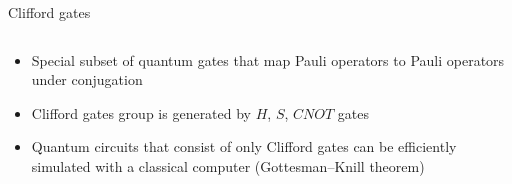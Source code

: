 \documentclass[aspectratio=169,10pt]{beamer}
\begin{document}
\begin{frame}{Clifford gates}
  \begin{columns}
    \begin{column}{0.45\textwidth}
      \begin{itemize}
        \item Special subset of quantum gates that map Pauli operators to Pauli operators under conjugation
        \item Clifford gates group is generated by $H$, $S$, $CNOT$ gates
        \item Quantum circuits that consist of only Clifford gates can be efficiently simulated with a classical computer (Gottesman–Knill theorem)
      \end{itemize}
    \end{column}
  \end{columns}
\end{frame}
\end{document}
